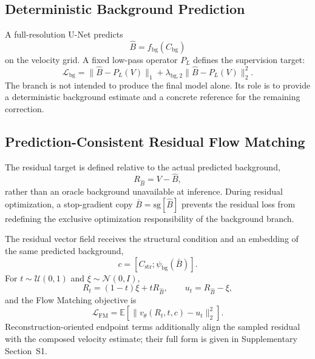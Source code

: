 \documentclass[remotesensing,article,submit,pdftex,moreauthors]{Definitions/mdpi}
\begin{document}
\subsection{Deterministic Background Prediction}

A full-resolution U-Net \citep{ronneberger2015unet} predicts
\begin{equation}
\hat B=f_{\mathrm{bg}}(C_{\mathrm{bg}})
\end{equation}
on the velocity grid. A fixed low-pass operator $P_L$ defines the supervision target:
\begin{equation}
\mathcal L_{\mathrm{bg}}
=
\|\hat B-P_L(V)\|_1
+\lambda_{\mathrm{bg},2}\|\hat B-P_L(V)\|_2^2.
\end{equation}
The branch is not intended to produce the final model alone. Its role is to provide a deterministic background estimate and a concrete reference for the remaining correction.

\subsection{Prediction-Consistent Residual Flow Matching}

The residual target is defined relative to the actual predicted background,
\begin{equation}
R_{\hat B}=V-\hat B,
\label{eq:rs_pred_residual}
\end{equation}
rather than an oracle background unavailable at inference. During residual optimization, a stop-gradient copy $\bar B=\mathrm{sg}[\hat B]$ prevents the residual loss from redefining the exclusive optimization responsibility of the background branch.

The residual vector field receives the structural condition and an embedding of the same predicted background,
\begin{equation}
c=[C_{\mathrm{str}};\psi_{\mathrm{bg}}(\bar B)].
\end{equation}
For $t\sim\mathcal U(0,1)$ and $\xi\sim\mathcal N(0,I)$,
\begin{equation}
R_t=(1-t)\xi+tR_{\hat B},
\qquad
u_t=R_{\hat B}-\xi,
\end{equation}
and the Flow Matching objective is
\begin{equation}
\mathcal L_{\mathrm{FM}}
=
\mathbb E\left[
\|v_\theta(R_t,t,c)-u_t\|_2^2
\right].
\end{equation}
Reconstruction-oriented endpoint terms additionally align the sampled residual with the composed velocity estimate; their full form is given in Supplementary Section~S1.
\end{document}
